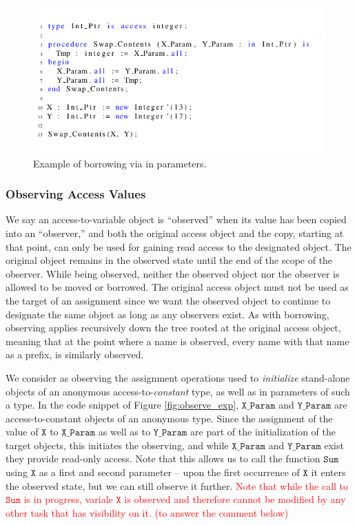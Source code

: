 \documentclass{llncs}
\newcommand\maroua[1]{\textcolor{red}{#1}}
\newcommand\var[1]{\ensuremath{\mathtt{#1}}}
\newcommand{\keyword}[1]{\textsf{#1}}
\begin{document}
\begin{figure}[htb!]
\centering
   \includegraphics[]{borrow_ex1}
   \caption{Example of borrowing via \keyword{in} parameters.}
   \label{fig:borrow_ex1}
\end{figure}


\subsubsection{Observing Access Values}
\label{sec:observing}

We say an access-to-variable object is ``observed'' when its value has been copied into an ``observer,'' and both the original
access object and the copy, starting at that point, can only be used for gaining read access to the designated object.
The original object remains in the observed state until the end of the scope of the observer. While being observed, neither the observed object nor the observer is allowed to be moved or
borrowed. The original access object must not be used as the target of an assignment since we want the observed object to continue
to designate the same object as long as any observers exist.  As with borrowing, observing applies recursively down the tree rooted at the original access object, meaning that at the point where a name is observed,
every name with that name as a prefix, is similarly observed.


We consider as observing the assignment operations used to \textit{initialize} stand-alone objects of an anonymous access-to-\textit{constant} type, as well as \keyword{in} parameters of such a type.
In the code snippet of Figure \ref{fig:observe_exp}, \var{X\_Param} and \var{Y\_Param} are access-to-constant objects of an anonymous type. Since the assignment of the value of \var{X} to \var{X\_Param}
as well as to \var{Y\_Param} are part of the initialization of the target objects, this initiates the observing, and while \var{X\_Param} and \var{Y\_Param} exist they provide read-only access. Note that
this allows us to call the function \var{Sum} using \var{X} as a first and second parameter -- upon the first occurrence of \var{X} it enters the observed state, but we can still observe it further.
\maroua{Note that while the call to \var{Sum} is in progress, variale \var{X} is observed and therefore cannot be modified by any other task that has visibility on it. (to answer the comment below)}
\end{document}

